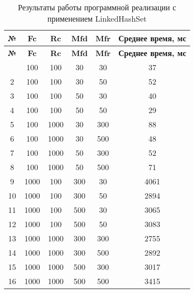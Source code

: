 \begin{longtable}{|c|c|c|c|c|c|}
    \caption{Результаты работы программной реализации с применением LinkedHashSet}
    \label{tab:linkedhashset}\\
    \hline
    \bfseries{№} & \bfseries{Fc} & \bfseries{Rc} & \bfseries{Mfd} & \bfseries{Mfr} & \bfseries{Среднее время, мс} \\
    \endfirsthead
    \bfseries{№} & \bfseries{Fc} & \bfseries{Rc} & \bfseries{Mfd} & \bfseries{Mfr} & \bfseries{Среднее время, мс} \\
    \endhead
    \endfoot
    \hline
    1 & 100 & 100 & 30 & 30 & 37 \\
    \hline
    2 & 100 & 100 & 30 & 50 & 52 \\
    \hline
    3 & 100 & 100 & 50 & 30 & 40 \\
    \hline
    4 & 100 & 100 & 50 & 50 & 29 \\
    \hline
    5 & 100 & 1000 & 30 & 300 & 88 \\
    \hline
    6 & 100 & 1000 & 30 & 500 & 48 \\
    \hline
    7 & 100 & 1000 & 50 & 300 & 52 \\
    \hline
    8 & 100 & 1000 & 50 & 500 & 71 \\
    \hline
    9 & 1000 & 100 & 300 & 30 & 4061 \\
    \hline
    10 & 1000 & 100 & 300 & 50 & 2894 \\
    \hline
    11 & 1000 & 100 & 500 & 30 & 3065 \\
    \hline
    12 & 1000 & 100 & 500 & 50 & 3083 \\
    \hline
    13 & 1000 & 1000 & 300 & 300 & 2755 \\
    \hline
    14 & 1000 & 1000 & 300 & 500 & 2892 \\
    \hline
    15 & 1000 & 1000 & 500 & 300 & 3017 \\
    \hline
    16 & 1000 & 1000 & 500 & 500 & 3415 \\
    \hline
\end{longtable}

